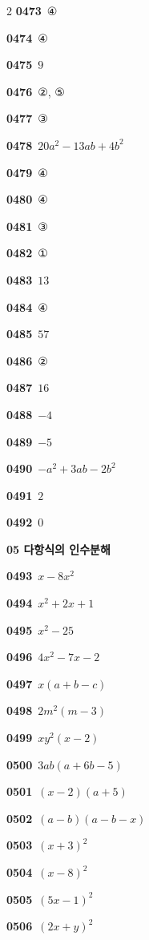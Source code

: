\documentclass[10pt,a4paper]{article}
\begin{document}
\begin{multicols}{2}
\noindent\textbf{0473}\ ④\par
\noindent\textbf{0474}\ ④\par
\noindent\textbf{0475}\ $9$\par
\noindent\textbf{0476}\ ②, ⑤\par
\noindent\textbf{0477}\ ③\par
\noindent\textbf{0478}\ $20a^2-13ab+4b^2$\par
\noindent\textbf{0479}\ ④\par
\noindent\textbf{0480}\ ④\par
\noindent\textbf{0481}\ ③\par
\noindent\textbf{0482}\ ①\par
\noindent\textbf{0483}\ $13$\par
\noindent\textbf{0484}\ ④\par
\noindent\textbf{0485}\ $57$\par
\noindent\textbf{0486}\ ②\par
\noindent\textbf{0487}\ $16$\par
\noindent\textbf{0488}\ $-4$\par
\noindent\textbf{0489}\ $-5$\par
\noindent\textbf{0490}\ $-a^2+3ab-2b^2$\par
\noindent\textbf{0491}\ $2$\par
\noindent\textbf{0492}\ $0$\par
\noindent\textbf{05 다항식의 인수분해}\par\smallskip
\noindent\textbf{0493}\ $x-8x^2$\par
\noindent\textbf{0494}\ $x^2+2x+1$\par
\noindent\textbf{0495}\ $x^2-25$\par
\noindent\textbf{0496}\ $4x^2-7x-2$\par
\noindent\textbf{0497}\ $x(a+b-c)$\par
\noindent\textbf{0498}\ $2m^2(m-3)$\par
\noindent\textbf{0499}\ $xy^2(x-2)$\par
\noindent\textbf{0500}\ $3ab(a+6b-5)$\par
\noindent\textbf{0501}\ $(x-2)(a+5)$\par
\noindent\textbf{0502}\ $(a-b)(a-b-x)$\par
\noindent\textbf{0503}\ $(x+3)^2$\par
\noindent\textbf{0504}\ $(x-8)^2$\par
\noindent\textbf{0505}\ $(5x-1)^2$\par
\noindent\textbf{0506}\ $(2x+y)^2$\par

\end{multicols}
\end{document}
